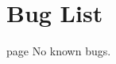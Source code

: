 \chapter{Bug List}
\hypertarget{bug}{}\label{bug}

\begin{DoxyRefList}
\item[page \doxylink{index}{ELEC 331 PA1\+: UDP-\/based TCP Implementation} ]\label{bug__bug000001}%
%
No known bugs. 
\end{DoxyRefList}